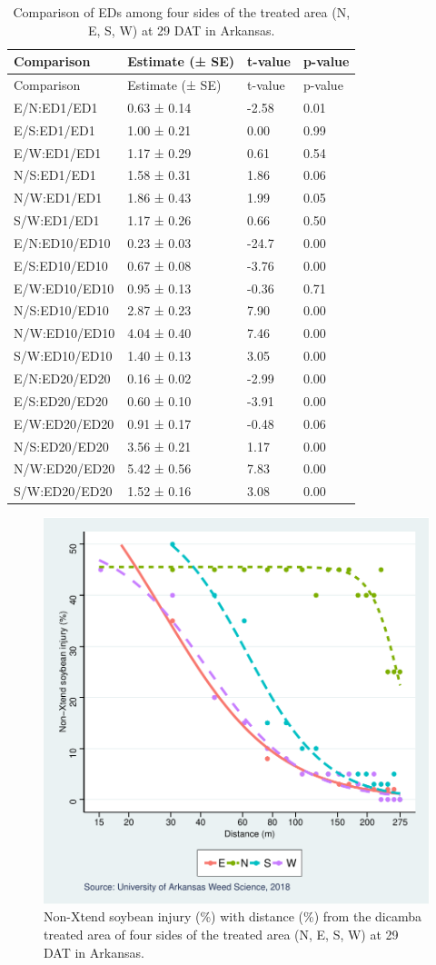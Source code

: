 \documentclass[]{article}
\begin{document}
\begin{longtable}[]{@{}llll@{}}
\caption{Comparison of EDs among four sides of the treated area (N, E,
S, W) at 29 DAT in Arkansas.}\tabularnewline
\toprule
Comparison & Estimate (± SE) & t-value & p-value\tabularnewline
\midrule
\endfirsthead
\toprule
Comparison & Estimate (± SE) & t-value & p-value\tabularnewline
\midrule
\endhead
E/N:ED1/ED1 & 0.63 ± 0.14 & -2.58 & 0.01\tabularnewline
E/S:ED1/ED1 & 1.00 ± 0.21 & 0.00 & 0.99\tabularnewline
E/W:ED1/ED1 & 1.17 ± 0.29 & 0.61 & 0.54\tabularnewline
N/S:ED1/ED1 & 1.58 ± 0.31 & 1.86 & 0.06\tabularnewline
N/W:ED1/ED1 & 1.86 ± 0.43 & 1.99 & 0.05\tabularnewline
S/W:ED1/ED1 & 1.17 ± 0.26 & 0.66 & 0.50\tabularnewline
E/N:ED10/ED10 & 0.23 ± 0.03 & -24.7 & 0.00\tabularnewline
E/S:ED10/ED10 & 0.67 ± 0.08 & -3.76 & 0.00\tabularnewline
E/W:ED10/ED10 & 0.95 ± 0.13 & -0.36 & 0.71\tabularnewline
N/S:ED10/ED10 & 2.87 ± 0.23 & 7.90 & 0.00\tabularnewline
N/W:ED10/ED10 & 4.04 ± 0.40 & 7.46 & 0.00\tabularnewline
S/W:ED10/ED10 & 1.40 ± 0.13 & 3.05 & 0.00\tabularnewline
E/N:ED20/ED20 & 0.16 ± 0.02 & -2.99 & 0.00\tabularnewline
E/S:ED20/ED20 & 0.60 ± 0.10 & -3.91 & 0.00\tabularnewline
E/W:ED20/ED20 & 0.91 ± 0.17 & -0.48 & 0.06\tabularnewline
N/S:ED20/ED20 & 3.56 ± 0.21 & 1.17 & 0.00\tabularnewline
N/W:ED20/ED20 & 5.42 ± 0.56 & 7.83 & 0.00\tabularnewline
S/W:ED20/ED20 & 1.52 ± 0.16 & 3.08 & 0.00\tabularnewline
\bottomrule
\end{longtable}

\begin{figure}
\centering
\includegraphics{Report_files/figure-latex/unnamed-chunk-22-1.pdf}
\caption{Non-Xtend soybean injury (\%) with distance (\%) from the
dicamba treated area of four sides of the treated area (N, E, S, W) at
29 DAT in Arkansas.}
\end{figure}
\end{document}
